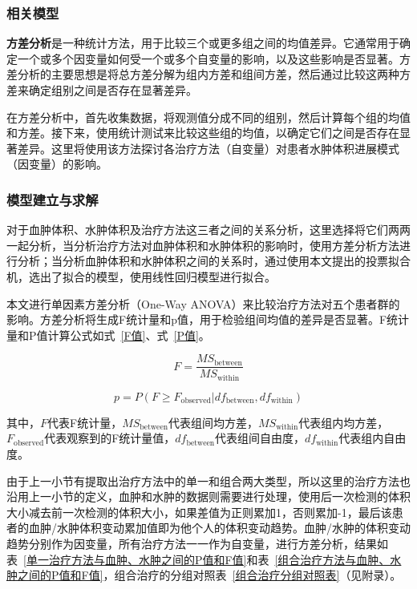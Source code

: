 \documentclass[bwprint]{gmcmthesis}
\begin{document}
\subsubsection{相关模型}

\textbf{方差分析}\cite{ANOVA}是一种统计方法，用于比较三个或更多组之间的均值差异。它通常用于确定一个或多个因变量如何受一个或多个自变量的影响，以及这些影响是否显著。方差分析的主要思想是将总方差分解为组内方差和组间方差，然后通过比较这两种方差来确定组别之间是否存在显著差异。

在方差分析中，首先收集数据，将观测值分成不同的组别，然后计算每个组的均值和方差。接下来，使用统计测试来比较这些组的均值，以确定它们之间是否存在显著差异。这里将使用该方法探讨各治疗方法（自变量）对患者水肿体积进展模式（因变量）的影响。

\subsubsection{模型建立与求解}

对于血肿体积、水肿体积及治疗方法这三者之间的关系分析，这里选择将它们两两一起分析，当分析治疗方法对血肿体积和水肿体积的影响时，使用方差分析方法进行分析；当分析血肿体积和水肿体积之间的关系时，通过使用本文提出的投票拟合机，选出了拟合的模型，使用线性回归模型进行拟合。

本文进行单因素方差分析（One-Way ANOVA）来比较治疗方法对五个患者群的影响。方差分析将生成F统计量和p值，用于检验组间均值的差异是否显著。F统计量和P值计算公式如式~\ref{F值}、式~\ref{P值}。

\begin{equation}
F = \frac{MS_{\text{between}}}{MS_{\text{within}}}
\label{F值}
\end{equation}

\begin{equation}
p = P(F \geq F_{\text{observed}} | df_{\text{between}}, df_{\text{within}})
\label{P值}
\end{equation}

\noindent 其中，$F$代表F统计量，$MS_{\text{between}}$代表组间均方差，$MS_{\text{within}}$代表组内均方差，$F_{\text{observed}}$代表观察到的F统计量值，$df_{\text{between}}$代表组间自由度，$df_{\text{within}}$代表组内自由度。

由于上一小节有提取出治疗方法中的单一和组合两大类型，所以这里的治疗方法也沿用上一小节的定义，血肿和水肿的数据则需要进行处理，使用后一次检测的体积大小减去前一次检测的体积大小，如果差值为正则累加1，否则累加-1，最后该患者的血肿/水肿体积变动累加值即为他个人的体积变动趋势。血肿/水肿的体积变动趋势分别作为因变量，所有治疗方法一一作为自变量，进行方差分析，结果如表~\ref{单一治疗方法与血肿、水肿之间的P值和F值}和表~\ref{组合治疗方法与血肿、水肿之间的P值和F值}，组合治疗的分组对照表~\ref{组合治疗分组对照表}（见附录）。
\end{document}
